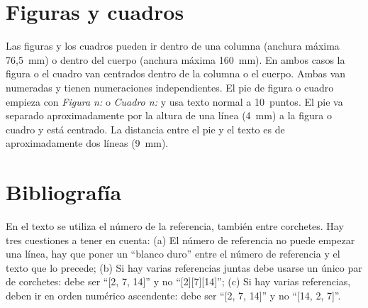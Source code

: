 \documentclass[twocolumn,twoside,a4paper, 10pt]{article}
\begin{document}
\section{Figuras y cuadros}

Las figuras y los cuadros pueden ir dentro de una columna (anchura 
máxima 76,5~mm) o dentro del cuerpo (anchura máxima 160~mm). En ambos 
casos la figura o el cuadro van centrados dentro de la columna o el 
cuerpo. Ambas van numeradas y tienen numeraciones independientes. El 
pie de figura o cuadro empieza con \emph{Figura n:} o \emph{Cuadro 
n:} y usa texto normal a 10~puntos. El pie  va separado 
aproximadamente por la altura de una línea (4~mm) a la figura o 
cuadro y está centrado. La distancia entre el pie y el texto es de 
aproximadamente dos líneas (9~mm).



\section{Bibliografía}
En el texto se utiliza el número de la referencia, también entre 
corchetes. Hay tres cuestiones a tener en cuenta: (a) El número de 
referencia no puede empezar una línea, hay que poner un ``blanco 
duro'' entre el número de referencia y el texto que lo precede; (b) 
Si hay varias referencias juntas debe usarse un único par de 
corchetes: debe ser ``[2, 7, 14]'' y no ``[2][7][14]''; (c) Si hay 
varias referencias, deben ir en orden numérico ascendente: debe ser  
``[2, 7, 14]'' y no ``[14, 2, 7]''.
\end{document}
